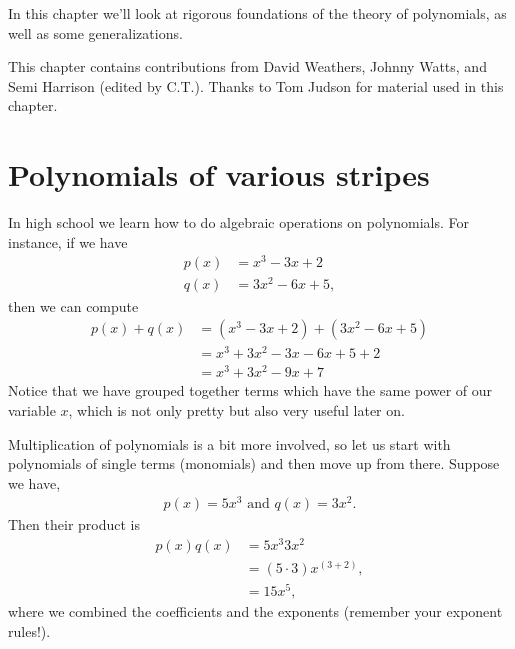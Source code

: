 

 
 In this chapter we'll look at rigorous foundations of the theory of polynomials, as well as some generalizations.
\bigskip

This chapter contains contributions from David Weathers, Johnny Watts, and Semi Harrison (edited by C.T.). Thanks to Tom Judson for material used in this chapter. 

\section{Polynomials of various stripes\quad
{}}
In high school we learn how to do algebraic operations on polynomials.
For instance, if we have
\begin{align*} 
p(x) & = x^3 -3x +2 \\
q(x) & = 3x^2 -6x +5,
\end{align*}
then we can compute 
\begin{align*}
p(x) + q(x) 
& =  ( x^3 - 3 x + 2 ) + ( 3 x^2 - 6 x + 5 ) \\
& = x^3 + 3x^2 - 3x - 6x + 5 + 2\\
& = x^3 + 3 x^2 - 9 x + 7
\end{align*}
Notice that we have grouped together terms which have the same power of our variable $x$, which is not only pretty but also very useful later on.  

Multiplication of polynomials is a bit more involved, so let us start with polynomials of single terms (monomials) and then move up from there.  Suppose we have,
\begin{align*} 
p(x)  = 5x^3\text{ and }  
q(x)  = 3x^2.
\end{align*}
Then their product is
\begin{align*}
p(x)  q(x) 
& =  5x^3 3 x^2 \\
& = (5 \cdot 3)x^{(3 + 2)},\\
& = 15x^5,
\end{align*}
where we combined the coefficients and the exponents (remember your exponent rules!).  

